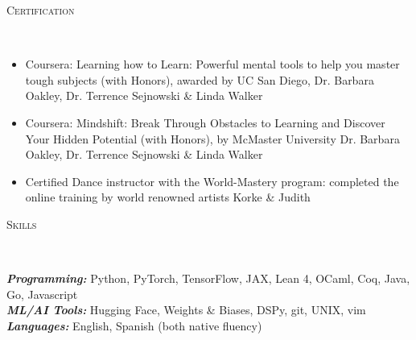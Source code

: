 \documentclass{article}
\newenvironment{changemargin}[2]{%
  \begin{list}{}{%
    \setlength{\topsep}{0pt}%
    \setlength{\leftmargin}{#1}%
    \setlength{\rightmargin}{#2}%
    \setlength{\listparindent}{\parindent}%
    \setlength{\itemindent}{\parindent}%
    \setlength{\parsep}{\parskip}%
  }%
  \item[]}{\end{list}
}
\newcommand{\lineover}{
	\begin{changemargin}{-0.05in}{-0.05in}
		\vspace*{-8pt}
		\hrulefill \\
		\vspace*{-2pt}
	\end{changemargin}
}
\newcommand{\header}[1]{
	\begin{changemargin}{-0.5in}{-0.5in}
		\scshape{#1}\\
  	\lineover
	\end{changemargin}
}
\newenvironment{body} {
	\vspace*{-16pt}
	\begin{changemargin}{-0.25in}{-0.5in}
  }	
	{\end{changemargin}
}
\begin{document}
\header{Certification}
\begin{body}
	\vspace{12pt}
	\begin{itemize} \itemsep -2pt  %
		\item Coursera: Learning how to Learn: Powerful mental tools to help you master tough subjects (with Honors), awarded by UC San Diego, Dr. Barbara Oakley, Dr. Terrence Sejnowski \& Linda Walker
	\end{itemize}
	\begin{itemize} \itemsep -2pt  %
		\item Coursera: Mindshift: Break Through Obstacles to Learning and Discover Your Hidden Potential (with Honors), by McMaster University Dr. Barbara Oakley, Dr. Terrence Sejnowski \& Linda Walker
	\end{itemize}
	\begin{itemize}
	    \item Certified Dance instructor with the World-Mastery program: completed the online training by world renowned artists Korke \& Judith
	\end{itemize}
\end{body}

\header{Skills}

\begin{body}
	\vspace{14pt}
	\emph{\textbf{Programming:}}{} Python, PyTorch, TensorFlow, JAX, Lean 4, OCaml, Coq, Java, Go, Javascript \\
	\smallskip
	\emph{\textbf{ML/AI Tools:}}{}  Hugging Face, Weights \& Biases, DSPy, git, UNIX, vim\\
	\smallskip
	\emph{\textbf{Languages:}}{} English, Spanish (both native fluency)\\
\end{body}
\smallskip
\end{document}
